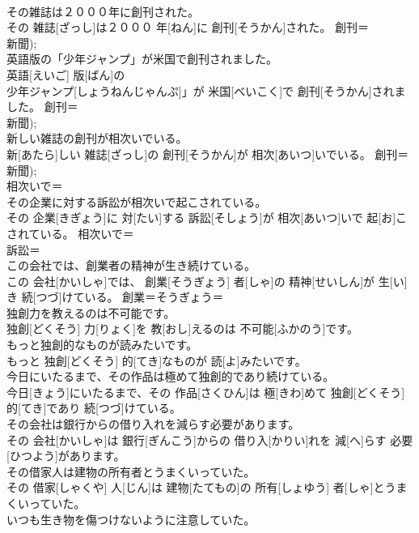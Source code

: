 \documentclass[8pt]{extreport}
\begin{document}
\begin{CJK}{UTF8}{min}
\\	その雑誌は２０００年に創刊された。	
\\	その 雑誌[ざっし]は２０００ 年[ねん]に 創刊[そうかん]された。	創刊＝ 
\\	新聞); 
\\	英語版の「少年ジャンプ」が米国で創刊されました。	
\\	英語[えいご] 版[ばん]の
\\	少年ジャンプ[しょうねんじゃんぷ]」が 米国[べいこく]で 創刊[そうかん]されました。	創刊＝ 
\\	新聞); 
\\	新しい雑誌の創刊が相次いでいる。	
\\	新[あたら]しい 雑誌[ざっし]の 創刊[そうかん]が 相次[あいつ]いでいる。	創刊＝ 
\\	新聞); 
\\	相次いで＝ 
\\	その企業に対する訴訟が相次いで起こされている。	
\\	その 企業[きぎょう]に 対[たい]する 訴訟[そしょう]が 相次[あいつ]いで 起[お]こされている。	相次いで＝ 
\\	訴訟＝ 
\\	この会社では、創業者の精神が生き続けている。	
\\	この 会社[かいしゃ]では、 創業[そうぎょう] 者[しゃ]の 精神[せいしん]が 生[い]き 続[つづ]けている。	創業＝そうぎょう＝ 
\\	独創力を教えるのは不可能です。	
\\	独創[どくそう] 力[りょく]を 教[おし]えるのは 不可能[ふかのう]です。	
\\	もっと独創的なものが読みたいです。	
\\	もっと 独創[どくそう] 的[てき]なものが 読[よ]みたいです。	
\\	今日にいたるまで、その作品は極めて独創的であり続けている。	
\\	今日[きょう]にいたるまで、その 作品[さくひん]は 極[きわ]めて 独創[どくそう] 的[てき]であり 続[つづ]けている。	
\\	その会社は銀行からの借り入れを減らす必要があります。	
\\	その 会社[かいしゃ]は 銀行[ぎんこう]からの 借り入[かりい]れを 減[へ]らす 必要[ひつよう]があります。	
\\	その借家人は建物の所有者とうまくいっていた。	
\\	その 借家[しゃくや] 人[じん]は 建物[たてもの]の 所有[しょゆう] 者[しゃ]とうまくいっていた。	
\\	いつも生き物を傷つけないように注意していた。	

\end{CJK}
\end{document}
